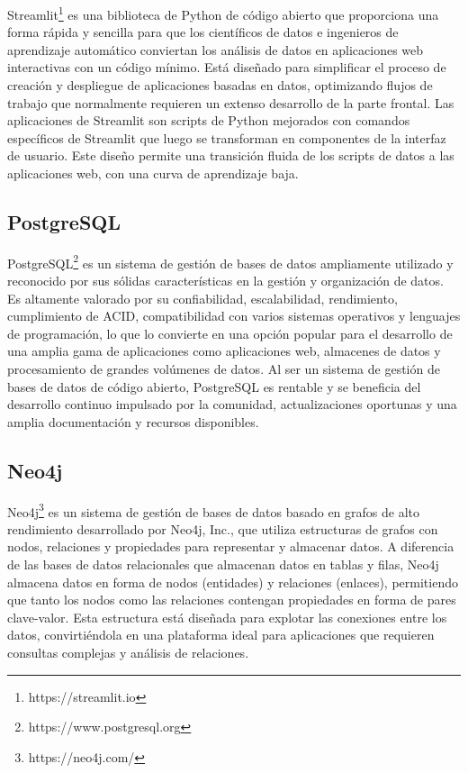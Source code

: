 Streamlit\footnote{https://streamlit.io} es una biblioteca de Python de código abierto que proporciona una forma rápida y sencilla para que los 
científicos de datos e ingenieros de aprendizaje automático conviertan los análisis de datos en aplicaciones web 
interactivas con un código mínimo. Está diseñado para simplificar el proceso de creación y despliegue de aplicaciones 
basadas en datos, optimizando flujos de trabajo que normalmente requieren un extenso desarrollo de la parte frontal. 
Las aplicaciones de Streamlit son scripts de Python mejorados con comandos específicos de Streamlit que luego se 
transforman en componentes de la interfaz de usuario. Este diseño 
permite una transición fluida de los scripts de datos a las aplicaciones web, con una curva de aprendizaje baja.


\subsection{PostgreSQL}

PostgreSQL\footnote{https://www.postgresql.org} es un sistema de gestión de bases de datos ampliamente utilizado y 
reconocido por sus sólidas 
características en la gestión y organización de datos. Es altamente valorado por su confiabilidad, escalabilidad, 
rendimiento, cumplimiento de ACID, compatibilidad con varios sistemas operativos y lenguajes de programación, lo que 
lo convierte en una opción popular para el desarrollo de una amplia gama de aplicaciones 
como aplicaciones web, 
almacenes de datos y procesamiento de grandes volúmenes de datos. 
Al ser un sistema de gesti\'on de bases de datos de código abierto, PostgreSQL es rentable y se beneficia del 
desarrollo continuo impulsado por la comunidad, actualizaciones oportunas y una amplia documentación y recursos 
disponibles.

\subsection{Neo4j}

Neo4j\footnote{https://neo4j.com/} es un sistema de gestión de bases de datos basado en grafos de alto rendimiento desarrollado por 
Neo4j, Inc., 
que utiliza estructuras de grafos con nodos, relaciones y propiedades para representar y almacenar datos. A 
diferencia de las bases de datos relacionales que almacenan datos en tablas y filas, Neo4j almacena datos en 
forma de nodos (entidades) y relaciones (enlaces), permitiendo que tanto los nodos como las relaciones contengan 
propiedades en forma de pares clave-valor. Esta estructura está diseñada para explotar las conexiones entre 
los datos, convirtiéndola en una plataforma ideal para aplicaciones que requieren consultas complejas y 
análisis de relaciones. 

